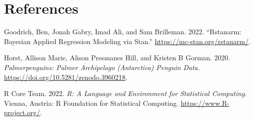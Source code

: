 \documentclass[
  letterpaper,
  DIV=11,
  numbers=noendperiod]{scrartcl}
\newlength{\cslhangindent}
\newlength{\cslentryspacingunit} %
\newenvironment{CSLReferences}[2] %
 {%
  \setlength{\parindent}{0pt}
  \ifodd #1
  \let\oldpar\par
  \def\par{\hangindent=\cslhangindent\oldpar}
  \fi
  \setlength{\parskip}{#2\cslentryspacingunit}
 }%
 {}
\begin{document}
\newpage

\hypertarget{references}{%
\section*{References}\label{references}}

\hypertarget{refs}{}
\begin{CSLReferences}{1}{0}
\leavevmode{}%
Goodrich, Ben, Jonah Gabry, Imad Ali, and Sam Brilleman. 2022.
{``Rstanarm: {Bayesian} Applied Regression Modeling via {Stan}.''}
\url{https://mc-stan.org/rstanarm/}.

\leavevmode{}%
Horst, Allison Marie, Alison Presmanes Hill, and Kristen B Gorman. 2020.
\emph{Palmerpenguins: Palmer Archipelago (Antarctica) Penguin Data}.
\url{https://doi.org/10.5281/zenodo.3960218}.

\leavevmode{}%
R Core Team. 2022. \emph{R: A Language and Environment for Statistical
Computing}. Vienna, Austria: R Foundation for Statistical Computing.
\url{https://www.R-project.org/}.

\end{CSLReferences}
\end{document}
